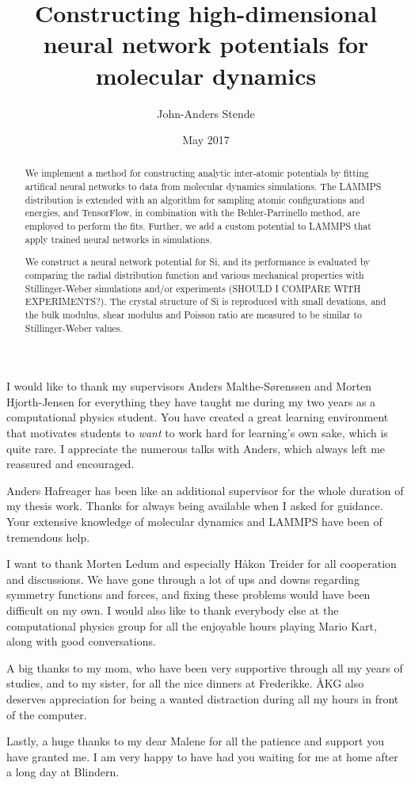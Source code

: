 \documentclass[twoside,english]{uiofysmaster}
\author{John-Anders Stende}
\title{Constructing high-dimensional neural network potentials for molecular dynamics}
\date{May 2017}
\begin{document}
\maketitle

\begin{abstract}
 We implement a method for constructing analytic inter-atomic potentials by fitting artifical neural networks to 
 data from molecular dynamics simulations. The LAMMPS distribution is extended with an algorithm  
 for sampling atomic configurations and energies, and TensorFlow, in combination with the Behler-Parrinello method, 
 are employed to perform the fits. 
 Further, we add a custom potential to LAMMPS that apply trained neural networks in simulations. 
  
 We construct a neural network potential for Si, and its performance is evaluated by comparing the radial distribution function
 and various mechanical properties with Stillinger-Weber simulations and/or experiments (SHOULD I COMPARE WITH EXPERIMENTS?). 
 The crystal structure of Si is reproduced with small devations, 
 and the bulk modulus, shear modulus and Poisson ratio are measured to be similar to Stillinger-Weber values. 
\end{abstract}

\begin{acknowledgements}
 I would like to thank my supervisors Anders Malthe-Sørenssen and Morten Hjorth-Jensen for everything they have taught 
 me during my two years as a computational physics student. You have created a great learning environment that motivates 
 students to \textit{want} to work hard for learning's own sake, which is quite rare. I appreciate the numerous
 talks with Anders, which always left me reassured and encouraged. 
 
 Anders Hafreager has been like an additional supervisor for the whole duration of my thesis work. 
 Thanks for always being available when I asked for guidance. Your extensive knowledge of molecular dynamics 
 and LAMMPS have been of tremendous help. 
 
 I want to thank Morten Ledum and especially H\aa{}kon Treider for all cooperation and discussions. 
 We have gone through a lot of ups and downs regarding symmetry functions and forces, and fixing these problems would have been 
 difficult on my own. I would also like to thank everybody else at the computational physics group for all the enjoyable hours
 playing Mario Kart, along with good conversations. 
 
 A big thanks to my mom, who have been very supportive through all my years of studies, and to my sister, for 
 all the nice dinners at Frederikke. \AA{}KG also deserves appreciation for being a wanted distraction during 
 all my hours in front of the computer. 
 
 Lastly, a huge thanks to my dear Malene for all the patience and support you have granted me. I am very happy to have had you 
 waiting for me at home after a long day at Blindern. 
\end{acknowledgements}
\end{document}
